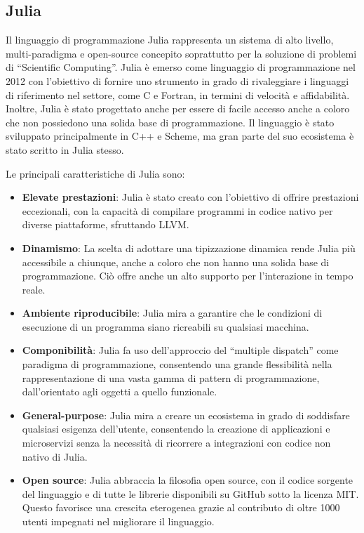 \subsection{Julia}

Il linguaggio di programmazione Julia rappresenta un sistema di alto 
livello, multi-paradigma e open-source concepito soprattutto per la soluzione di problemi di ``Scientific Computing''. Julia è 
emerso come linguaggio di programmazione nel 2012 con 
l'obiettivo di fornire uno strumento in grado di rivaleggiare i linguaggi di riferimento nel settore, come C e Fortran, 
in termini di velocità e affidabilità. Inoltre, Julia è stato progettato 
anche per essere di facile accesso anche a coloro che non possiedono una 
solida base di programmazione. Il linguaggio è stato sviluppato 
principalmente in C++ e Scheme, ma gran parte del suo ecosistema è 
stato scritto in Julia stesso.

Le principali caratteristiche di Julia sono:

\begin{itemize}
    \item \textbf{Elevate prestazioni}: Julia è stato creato con 
    l'obiettivo di offrire prestazioni eccezionali, con la capacità di 
    compilare programmi in codice nativo per diverse piattaforme, 
    sfruttando LLVM.
    \item \textbf{Dinamismo}: La scelta di adottare una tipizzazione 
    dinamica rende Julia più accessibile a chiunque, anche a coloro 
    che non hanno una solida base di programmazione. Ciò offre 
    anche un alto supporto per l'interazione in tempo reale.
    \item \textbf{Ambiente riproducibile}: Julia mira a garantire che le 
    condizioni di esecuzione di un programma siano ricreabili su 
    qualsiasi macchina. 
    \item \textbf{Componibilità}: Julia fa uso dell'approccio del 
    ``multiple dispatch'' come paradigma di programmazione, consentendo 
    una grande flessibilità nella rappresentazione di una vasta gamma 
    di pattern di programmazione, dall'orientato agli oggetti a quello 
    funzionale.
    \item \textbf{General-purpose}: Julia mira a creare un ecosistema in 
    grado di soddisfare qualsiasi esigenza dell'utente, consentendo la 
    creazione di applicazioni e microservizi senza la necessità di 
    ricorrere a integrazioni con codice non nativo di Julia.
    \item \textbf{Open source}: Julia abbraccia la filosofia open source, 
    con il codice sorgente del linguaggio e di tutte le librerie 
    disponibili su GitHub sotto la licenza MIT. Questo favorisce una 
    crescita eterogenea grazie al contributo di oltre 1000 utenti 
    impegnati nel migliorare il linguaggio.
\end{itemize}

